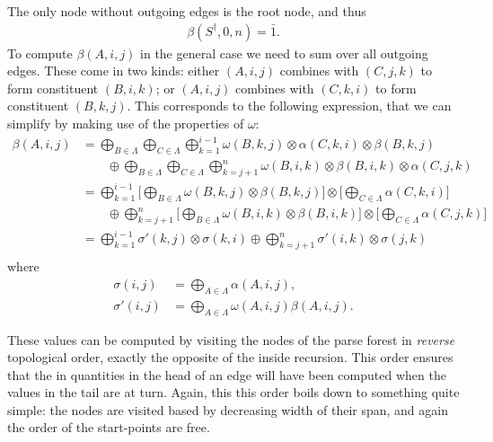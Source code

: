     The only node without outgoing edges is the root node, and thus
    \begin{align*}
      \beta(S^{\dagger}, 0, n) = \bar{1}.
    \end{align*}
    To compute $\beta(A, i, j)$ in the general case we need to sum over all outgoing edges. These come in two kinds: either $(A, i, j)$ combines with $(C, j, k)$ to form constituent $(B, i, k)$; or $(A, i, j)$ combines with $(C, k, i)$ to form constituent $(B, k, j)$. This corresponds to the following expression, that we can simplify by making use of the properties of $\omega$:
    \begin{align*}
      \beta(A, i, j)
        &= \bigoplus_{B \in \Lambda} \bigoplus_{C \in \Lambda} \bigoplus_{k=1}^{i-1} \omega(B, k, j) \otimes \alpha(C, k, i) \otimes \beta(B, k, j) \\
          &\qquad \oplus \bigoplus_{B \in \Lambda} \bigoplus_{C \in \Lambda} \bigoplus_{k=j+1}^{n} \omega(B, i, k) \otimes \beta(B, i, k) \otimes \alpha(C, j, k) \\
        &=  \bigoplus_{k=1}^{i-1}  \Bigg[ \bigoplus_{B \in \Lambda} \omega(B, k, j)  \otimes \beta(B, k, j) \Bigg] \otimes \Bigg[ \bigoplus_{C \in \Lambda} \alpha(C, k, i) \Bigg] \\
          &\qquad \oplus \bigoplus_{k=j+1}^{n}  \Bigg[ \bigoplus_{B \in \Lambda}  \omega(B, i, k) \otimes \beta(B, i, k) \Bigg] \otimes  \Bigg[  \bigoplus_{C \in \Lambda} \alpha(C, j, k) \Bigg] \\
        &=  \bigoplus_{k=1}^{i-1}  \sigma'(k, j) \otimes \sigma(k, i) \oplus \bigoplus_{k=j+1}^{n} \sigma'(i, k) \otimes  \sigma(j, k) \\
    \end{align*}
    where
    \begin{align*}
        \sigma(i, j) &= \bigoplus_{A \in \Lambda} \alpha(A, i, j),  \\
        \sigma'(i, j) &= \bigoplus_{A \in \Lambda} \omega(A, i, j) \beta(A, i, j).
    \end{align*}

    These values can be computed by visiting the nodes of the parse forest in \textit{reverse} topological order, exactly the opposite of the inside recursion. This order ensures that the in quantities in the head of an edge will have been computed when the values in the tail are at turn. Again, this this order boils down to something quite simple: the nodes are visited based by decreasing width of their span, and again the order of the start-points are free.

